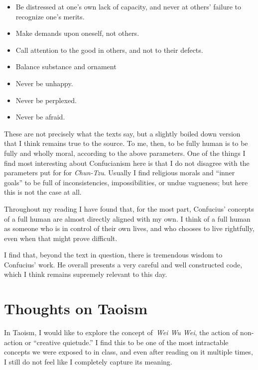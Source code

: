 \documentclass[12pt,letterpaper]{article}
\begin{document}
\begin{spacing}{2}
\begin{itemize}
        \item Be distressed at one's own lack of capacity, and never at others'
            failure to recognize one's merits.
        \item Make demands upon oneself, not others.
        \item Call attention to the good in others, and not to their defects.
        \item Balance substance and ornament
        \item Never be unhappy.
        \item Never be perplexed.
        \item Never be afraid.
    \end{itemize}

    These are not precisely what the texts say, but a slightly boiled down
    version that I think remains true to the source. To me, then, to be fully
    human is to be fully and wholly moral, according to the above parameters.
    One of the things I find most interesting about Confucianism here is that I
    do not disagree with the parameters put for for \emph{Chun-Tzu}. Usually I
    find religious morals and ``inner goals'' to be full of inconsistencies,
    impossibilities, or undue vagueness; but here this is not the case at all.

    Throughout my reading I have found that, for the most part, Confucius'
    concepts of a full human are almost directly aligned with my own. I think of
    a full human as someone who is in control of their own lives, and who
    chooses to live rightfully, even when that might prove difficult.

    I find that, beyond the text in question, there is tremendous wisdom to
    Confucius' work. He overall presents a very careful and well constructed
    code, which I think remains supremely relevant to this day.

    \section{Thoughts on Taoism}
    In Taoism, I would like to explore the concept of \emph{Wei Wu Wei}, the
    action of non-action or ``creative quietude.'' I find this to be one of the
    most intractable concepts we were exposed to in class, and even after
    reading on it multiple times, I still do not feel like I completely capture
    its meaning.


\end{spacing}
\end{document}
